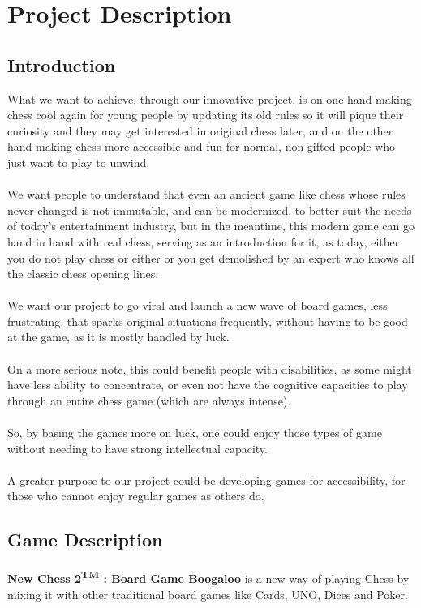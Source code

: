 \documentclass[12pt]{article}
\begin{document}
    \section{Project Description}
        \subsection{Introduction}
            What we want to achieve, through our innovative project, is on one hand making chess cool again for young people by updating its old rules so it will pique their curiosity and they may get interested in original chess later, and on the other hand making chess more accessible and fun for normal, non-gifted people who just want to play to unwind.
            \\\\We want people to understand that even an ancient game like chess whose rules never changed is not immutable, and can be modernized, to better suit the needs of today's entertainment industry, but in the meantime, this modern game can go hand in hand with real chess, serving as an introduction for it, as today, either you do not play chess or either or you get demolished by an expert who knows all the classic chess opening lines.
            \\\\We want our project to go viral and launch a new wave of board games, less frustrating, that sparks original situations frequently, without having to be good at the game, as it is mostly handled by luck.
            \\\\On a more serious note, this could benefit people with disabilities, as some might have less ability to concentrate, or even not have the cognitive capacities to play through an entire chess game (which are always intense).
            \\\\So, by basing the games more on luck, one could enjoy those types of game without needing to have strong intellectual capacity.
            \\\\A greater purpose to our project could be developing games for accessibility, for those who cannot enjoy regular games as others do.

        \subsection{Game Description}
            \paragraph{}
                \textbf{New Chess 2\textsuperscript{TM} : Board Game Boogaloo} is a new way of playing Chess by mixing it with other traditional board games like Cards, UNO, Dices and Poker.
                
\end{document}
